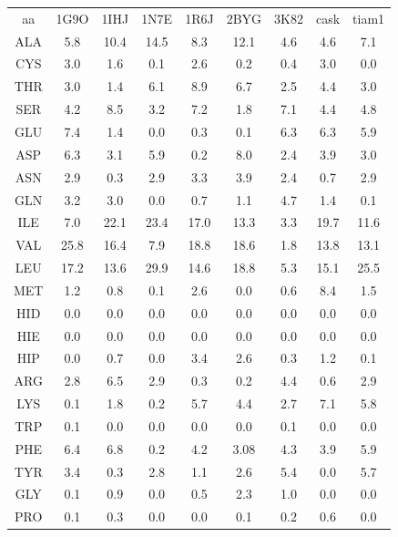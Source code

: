     \begin{table}[!htbp]
      \centering

      \begin{tabular}{ccccccccc}

        \toprule
        aa & 1G9O & 1IHJ & 1N7E & 1R6J & 2BYG & 3K82 & cask & tiam1 \\
        \cmidrule{1-9}
     ALA  & 5.8  & 10.4 & 14.5  & 8.3  &  12.1 &  4.6 &    4.6   &     7.1  \\
     CYS  & 3.0  & 1.6  & 0.1   & 2.6  &  0.2  &  0.4 &    3.0   &     0.0  \\
     THR  & 3.0  & 1.4  & 6.1   &  8.9  &  6.7  &  2.5 &    4.4   &     3.0  \\
        \cmidrule{1-9}
     SER  & 4.2  & 8.5  & 3.2   & 7.2  &  1.8  &  7.1 &    4.4   &     4.8  \\
        \cmidrule{1-9}
     GLU  & 7.4  & 1.4  & 0.0   & 0.3  &  0.1  &  6.3 &    6.3   &     5.9  \\
     ASP  & 6.3  & 3.1  & 5.9   & 0.2  &  8.0  &  2.4 &    3.9   &     3.0  \\
        \cmidrule{1-9}
     ASN  & 2.9   & 0.3  & 2.9  & 3.3  &  3.9  &  2.4 &    0.7   &     2.9  \\
     GLN  & 3.2  & 3.0  & 0.0   & 0.7  &  1.1  &  4.7 &    1.4   &     0.1  \\
        \cmidrule{1-9}
     ILE  & 7.0  & 22.1 & 23.4  & 17.0 &  13.3 &  3.3 &    19.7  &     11.6  \\
     VAL  & 25.8 & 16.4 & 7.9   & 18.8 &  18.6 &  1.8 &    13.8  &     13.1  \\
     LEU  & 17.2 & 13.6 & 29.9  & 14.6 &  18.8 &  5.3 &    15.1  &     25.5  \\
        \cmidrule{1-9}
     MET  & 1.2  & 0.8  & 0.1   & 2.6  &  0.0  &  0.6 &    8.4   &     1.5  \\
        \cmidrule{1-9}
     HID  & 0.0  & 0.0  & 0.0   & 0.0  &  0.0  &  0.0 &    0.0   &     0.0  \\
     HIE  & 0.0  & 0.0  & 0.0   & 0.0  &  0.0  &  0.0 &    0.0   &     0.0  \\
     HIP  & 0.0  & 0.7  & 0.0   & 3.4  &  2.6  &  0.3 &    1.2   &     0.1  \\
        \cmidrule{1-9}
     ARG  & 2.8  & 6.5  & 2.9   & 0.3  &  0.2  &  4.4 &    0.6   &     2.9  \\
        \cmidrule{1-9}
     LYS  & 0.1  & 1.8  & 0.2   & 5.7  &  4.4  &  2.7 &    7.1   &     5.8  \\
        \cmidrule{1-9}
     TRP  & 0.1 & 0.0  & 0.0    & 0.0  &  0.0  &  0.1 &    0.0   &     0.0  \\
        \cmidrule{1-9}
     PHE  & 6.4  & 6.8  & 0.2  & 4.2  &  3.08 &  4.3 &    3.9   &     5.9  \\
        \cmidrule{1-9}
     TYR  & 3.4  & 0.3  & 2.8  & 1.1  &  2.6  &  5.4 &    0.0   &     5.7  \\
        \cmidrule{1-9}
     GLY  & 0.1  & 0.9  & 0.0  & 0.5  &  2.3  &  1.0 &    0.0   &     0.0  \\
     PRO  & 0.1  & 0.3  & 0.0  & 0.0  &  0.1  &  0.2 &    0.6   &     0.0  \\


\end{tabular}
\end{table}
